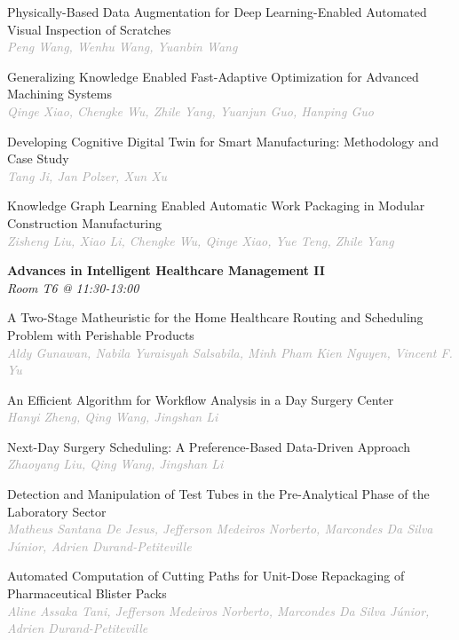 \begin{multicols*}{2}
\small Physically-Based Data Augmentation for Deep Learning-Enabled Automated Visual Inspection of Scratches\\ 
\footnotesize \textcolor{darkgray}{\textit{Peng Wang, Wenhu  Wang, Yuanbin  Wang}}

\small Generalizing Knowledge Enabled Fast-Adaptive Optimization for Advanced Machining Systems\\ 
\footnotesize \textcolor{darkgray}{\textit{Qinge Xiao, Chengke  Wu, Zhile  Yang, Yuanjun  Guo, Hanping  Guo}}

\small Developing Cognitive Digital Twin for Smart Manufacturing: Methodology and Case Study\\ 
\footnotesize \textcolor{darkgray}{\textit{Tang Ji, Jan  Polzer, Xun  Xu}}

\small Knowledge Graph Learning Enabled Automatic Work Packaging in Modular Construction Manufacturing\\ 
\footnotesize \textcolor{darkgray}{\textit{Zisheng Liu, Xiao  Li, Chengke  Wu, Qinge  Xiao, Yue  Teng, Zhile  Yang}}

\normalsize \textbf{Advances in Intelligent Healthcare Management II}\\
\small \textit{Room T6 @ 11:30-13:00}

\small A Two-Stage Matheuristic for the Home Healthcare Routing and Scheduling Problem with Perishable Products\\ 
\footnotesize \textcolor{darkgray}{\textit{Aldy Gunawan, Nabila Yuraisyah  Salsabila, Minh Pham Kien  Nguyen, Vincent F.  Yu}}

\small An Efficient Algorithm for Workflow Analysis in a Day Surgery Center\\ 
\footnotesize \textcolor{darkgray}{\textit{Hanyi Zheng, Qing  Wang, Jingshan  Li}}

\small Next-Day Surgery Scheduling: A Preference-Based Data-Driven Approach\\ 
\footnotesize \textcolor{darkgray}{\textit{Zhaoyang Liu, Qing  Wang, Jingshan  Li}}

\small Detection and Manipulation of Test Tubes in the Pre-Analytical Phase of the Laboratory Sector\\ 
\footnotesize \textcolor{darkgray}{\textit{Matheus Santana De Jesus, Jefferson Medeiros  Norberto, Marcondes  Da Silva Júnior, Adrien  Durand-Petiteville}}

\small Automated Computation of Cutting Paths for Unit-Dose Repackaging of Pharmaceutical Blister Packs\\ 
\footnotesize \textcolor{darkgray}{\textit{Aline Assaka Tani, Jefferson Medeiros  Norberto, Marcondes  Da Silva Júnior, Adrien  Durand-Petiteville}}


\end{multicols*}
